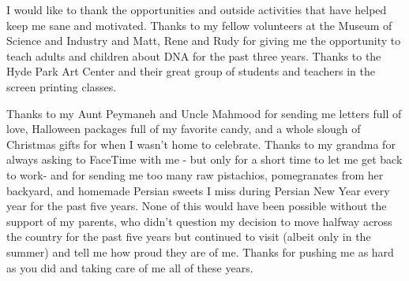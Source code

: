 I would like to thank the opportunities and outside activities that have helped keep me sane and motivated. Thanks to my fellow volunteers at the Museum of Science and Industry and Matt, Rene and Rudy for giving me the opportunity to teach adults and children about DNA for the past three years. Thanks to the Hyde Park Art Center and their great group of students and teachers in the screen printing classes. 

Thanks to my Aunt Peymaneh and Uncle Mahmood for sending me letters full of love, Halloween packages full of my favorite candy, and a whole slough of Christmas gifts for when I wasn't home to celebrate. Thanks to my grandma for always asking to FaceTime with me - but only for a short time to let me get back to work- and for sending me too many raw pistachios, pomegranates from her backyard, and homemade Persian sweets I miss during Persian New Year every year for the past five years. None of this would have been possible without the support of my parents, who didn't question my decision to move halfway across the country for the past five years but continued to visit (albeit only in the summer) and tell me how proud they are of me. Thanks for pushing me as hard as you did and taking care of me all of these years. 